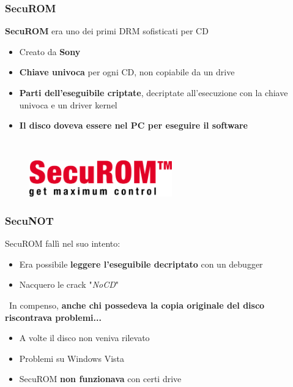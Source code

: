 \documentclass{beamer}
\begin{document}
	\begin{frame}
		\frametitle{SecuROM}
		\textbf{SecuROM} era uno dei primi DRM sofisticati per CD
		\begin{itemize}
			\item Creato da \textbf{Sony}
			\item \textbf{Chiave univoca} per ogni CD, non copiabile da un drive
			\item \textbf{Parti dell'eseguibile criptate}, decriptate all'esecuzione con la chiave univoca e un driver kernel
			\item \textbf{Il disco doveva essere nel PC per eseguire il software}
		\end{itemize}
		\,\newline
		\begin{figure}
			\includegraphics[width=0.55\textwidth]{imgs/SecuROM_logo.png}
		\end{figure}
	\end{frame}
	\begin{frame}
		\frametitle{SecuNOT}
		SecuROM fallì nel suo intento:
		\begin{itemize}
			\item Era possibile \textbf{leggere l'eseguibile decriptato} con un debugger
			\item Nacquero le crack "\textit{NoCD}"
		\end{itemize}
		\, \newline
		In compenso, \textbf{anche chi possedeva la copia originale del disco riscontrava problemi...}
		\begin{itemize}
			\item A volte il disco non veniva rilevato
			\item Problemi su Windows Vista
			\item SecuROM \textbf{non funzionava} con certi drive
		\end{itemize}
	\end{frame}
\end{document}
